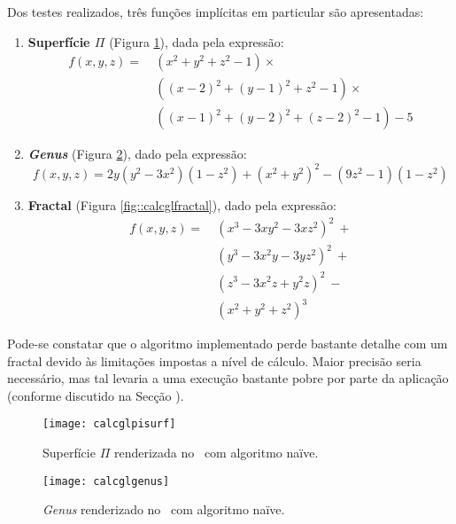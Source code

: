 Dos testes realizados, três funções implícitas em particular são apresentadas:

\begin{enumerate}
	\item \textbf{Superfície $\Pi$} (Figura \ref{fig::calcglpisurf}), dada pela expressão:
	\begin{align*}
		f(x,y,z) = ~& \left(x^2 + y^2 + z^2 - 1\right) \times \\
	                & \left((x-2)^2 + (y-1)^2 + z^2 - 1\right) \times \\
		            & \left((x-1)^2 + (y-2)^2 + (z-2)^2 - 1\right) - 5
	\end{align*}

	\item \textbf{\textit{Genus}} (Figura \ref{fig::calcglgenus}), dado pela expressão:
	\begin{equation*}
		f(x,y,z) = 2y(y^2 - 3x^2)(1-z^2) + (x^2 + y^2)^2 - (9z^2 - 1)(1 - z^2)
	\end{equation*}

	\item \textbf{Fractal} (Figura \ref{fig::calcglfractal}), dado pela expressão:
	\begin{align*}
		f(x,y,z) =~ & (x^3 - 3xy^2 - 3xz^2)^2 ~+ \\
		            & (y^3 - 3x^2y - 3yz^2)^2 ~+ \\
		            & (z^3 - 3x^2z + y^2z)^2  ~- \\
		            & (x^2 + y^2 + z^2)^3
	\end{align*}
\end{enumerate}

Pode-se constatar que o algoritmo implementado perde bastante detalhe com um fractal devido às limitações impostas a nível de cálculo. Maior precisão seria necessário, mas tal levaria a uma execução bastante pobre por parte da aplicação (conforme discutido na Secção ).

\begin{figure}[!htbp]
	\centering
	\texttt{[image: calcglpisurf]}
	\caption[Superfície $\Pi$ no \theapp~com algoritmo naïve]{Superfície $\Pi$ renderizada no \theapp~com algoritmo naïve.}
	\label{fig::calcglpisurf}
\end{figure}

\begin{figure}[!htbp]
	\centering
	\texttt{[image: calcglgenus]}
	\caption[\textit{Genus} no \theapp~com algoritmo naïve]{\textit{Genus} renderizado no \theapp~com algoritmo naïve.}
	\label{fig::calcglgenus}
\end{figure}


